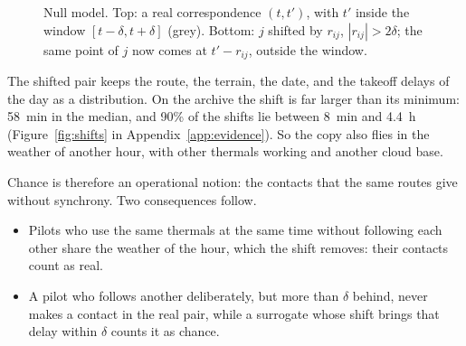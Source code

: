 \begin{figure}
\centering
{}
\caption{Null model. Top: a real correspondence $(t,t')$, with $t'$ inside the window
$[t-\delta,t+\delta]$ (grey). Bottom: $j$ shifted by $r_{ij}$, $|r_{ij}|>2\delta$; the same point
of $j$ now comes at $t'-r_{ij}$, outside the window.}
\label{fig:null}
\end{figure}

The shifted pair keeps the route, the terrain, the date, and the takeoff delays of the day as a
distribution. On the archive the shift is far larger than its minimum: 58~min in the median, and
90\% of the shifts lie between 8~min and 4.4~h (Figure~\ref{fig:shifts} in
Appendix~\ref{app:evidence}). So the copy also flies in the weather of another hour, with other
thermals working and another cloud base.

Chance is therefore an operational notion: the contacts that the same routes give without
synchrony. Two consequences follow.
\begin{itemize}
\item Pilots who use the same thermals at the same time without following each other share the
  weather of the hour, which the shift removes: their contacts count as real.
\item A pilot who follows another deliberately, but more than $\delta$ behind, never makes a
  contact in the real pair, while a surrogate whose shift brings that delay within $\delta$ counts
  it as chance.
\end{itemize}

